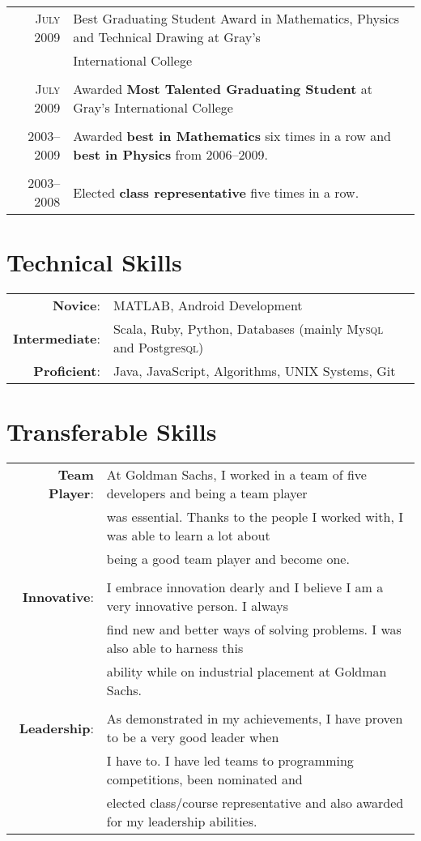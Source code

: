 \documentclass[a4paper,10pt]{article}
\begin{document}
\begin{tabular}{rl}
  \textsc{July} 2009 & Best Graduating Student Award in Mathematics, Physics and Technical Drawing
  at Gray’s\\& International College\\\\

  \textsc{July} 2009 & Awarded \textbf{Most Talented Graduating Student} at Gray’s International
  College\\\\

  \textsc{2003--2009} & Awarded \textbf{best in Mathematics} six times in a row and \textbf{best in
  Physics} from 2006--2009.\\\\

  \textsc{2003--2008} & Elected \textbf{class representative} five times in a row.
\end{tabular}

\section{Technical Skills}
\begin{tabular}{rl}
  \textbf{Novice}:       & MATLAB, Android Development\\
  \textbf{Intermediate}: & Scala, Ruby, Python, Databases (mainly My\textsc{sql} and Postgre\textsc{sql})\\
  \textbf{Proficient}:   & Java, JavaScript, Algorithms, UNIX Systems, Git
\end{tabular}

\section{Transferable Skills}
\begin{tabular}{rl}
  \textbf{Team Player}: & At Goldman Sachs, I worked in a team of five developers and being a team
  player\\& was essential. Thanks to the people I worked with, I was able to learn a lot about\\&
  being a good team player and become one.\\\\

  \textbf{Innovative}: & I embrace innovation dearly and I believe I am a very innovative person. I
  always\\& find new and better ways of solving problems. I was also able to harness this\\& ability
  while on industrial placement at Goldman Sachs. \\\\

  \textbf{Leadership}: & As demonstrated in my achievements, I have proven to be a very good leader
  when\\& I have to. I have led teams to programming competitions, been nominated and\\& elected
  class/course representative and also awarded for my leadership abilities.
\end{tabular}
\end{document}
